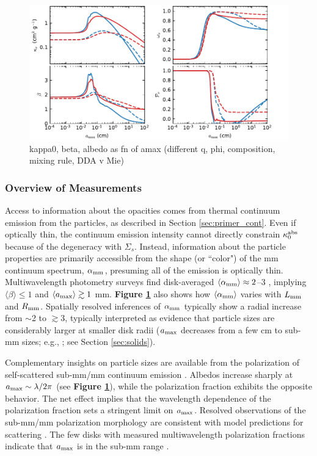\documentclass[a4paper]{ar-1col}
\begin{document}
\begin{figure}[t]
\includegraphics[width=\textwidth]{opac.pdf}
\caption{kappa0, beta, albedo as fn of amax (different q, phi, composition, mixing rule, DDA v Mie)}
\label{fig:opac}
\end{figure}

\subsubsection{Overview of Measurements}
Access to information about the opacities comes from thermal continuum emission from the particles, as described in Section \ref{sec:primer_cont}.  Even if optically thin, the continuum emission intensity cannot directly constrain $\kappa_0^{\rm abs}$ because of the degeneracy with $\Sigma_s$.  Instead, information about the particle properties are primarily accessible from the shape (or ``color") of the mm continuum spectrum, $\alpha_{\rm mm}$, presuming all of the emission is optically thin.  Multiwavelength photometry surveys find disk-averaged $\langle \alpha_{\rm mm} \rangle \approx 2$--3 \citep{beckwith91,mannings94,ricci10a,ricci10b,ricci12}, implying $\langle \beta \rangle \le 1$ and $\langle a_{\rm max} \rangle \gtrsim 1$ mm.  {\bf Figure \ref{fig:opac}} also shows how $\langle \alpha_{\rm mm} \rangle$ varies with $L_{\rm mm}$ and $R_{\rm mm}$.  Spatially resolved inferences of $\alpha_{\rm mm}$ typically show a radial increase from $\sim$2 to $\gtrsim$3, typically interpreted as evidence that particle sizes are considerably larger at smaller disk radii ($a_{\rm max}$ decreases from a few cm to sub-mm sizes; e.g., \citealt{perez12,lperez15,menu14,tazzari16}; see Section \ref{sec:solids}). 

Complementary insights on particle sizes are available from the polarization of self-scattered sub-mm/mm continuum emission \citep{hughes09b,kataoka15}.  Albedos increase sharply at $a_{\rm max} \sim \lambda / 2\pi$ (see {\bf Figure \ref{fig:opac}}), while the polarization fraction exhibits the opposite behavior.  The net effect implies that the wavelength dependence of the polarization fraction sets a stringent limit on $a_{\rm max}$.  Resolved observations of the sub-mm/mm polarization morphology are consistent with model predictions for scattering \citep{kataoka16a,yang17,stephens17,hull18,bacciotti18,dent19}.  The few disks with measured multiwavelength polarization fractions indicate that $a_{\rm max}$ is in the sub-mm range \citep[e.g.,][]{kataoka16b,ohashi18}.  
\end{document}
